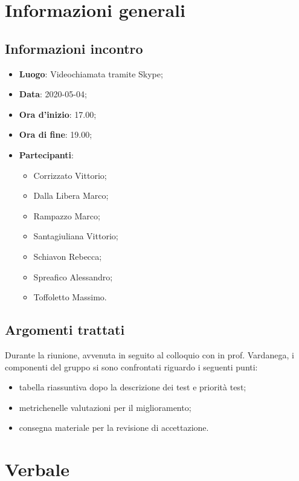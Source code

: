 \section{Informazioni generali}
    \subsection{Informazioni incontro}
        \begin{itemize}
            \item \textbf{Luogo}: Videochiamata tramite Skype;
            \item \textbf{Data}: 2020-05-04;
            \item \textbf{Ora d'inizio}: 17.00;
            \item \textbf{Ora di fine}: 19.00;
            \item \textbf{Partecipanti}: 
            \begin{itemize}
                \item Corrizzato Vittorio;
                \item Dalla Libera Marco;
                \item Rampazzo Marco;
                \item Santagiuliana Vittorio;
                \item Schiavon Rebecca;
                \item Spreafico Alessandro;
                \item Toffoletto Massimo.
            \end{itemize}
        \end{itemize}
    \subsection{Argomenti trattati}
        Durante la riunione, avvenuta in seguito al colloquio con in prof. Vardanega, i componenti del gruppo si sono confrontati riguardo i seguenti punti:
		\begin{itemize}
			\item tabella riassuntiva dopo la descrizione dei test e priorità test;
			\item metriche\glosp nelle valutazioni per il miglioramento;
			\item consegna materiale per la revisione di accettazione.
		\end{itemize}
\section{Verbale}
